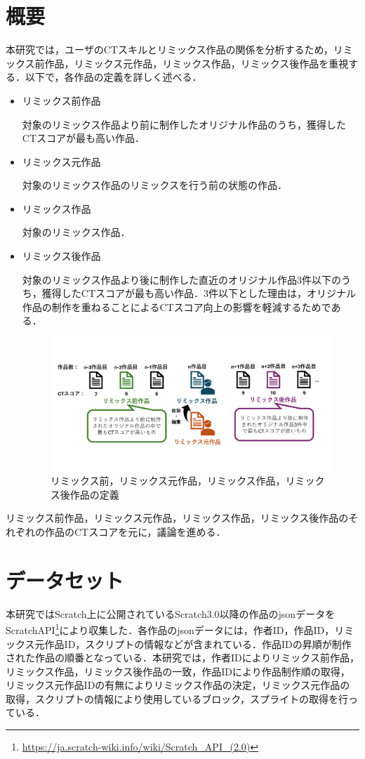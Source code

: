 \documentclass[11pt]{jreport}
\begin{document}
\section{概要}
本研究では，ユーザのCTスキルとリミックス作品の関係を分析するため，リミックス前作品，リミックス元作品，リミックス作品，リミックス後作品を重視する．以下で，各作品の定義を詳しく述べる．
\begin{itemize}
  \item リミックス前作品
  
  対象のリミックス作品より前に制作したオリジナル作品のうち，獲得したCTスコアが最も高い作品．
  
  \item リミックス元作品
  
  対象のリミックス作品のリミックスを行う前の状態の作品．
  
  \item リミックス作品
  
  対象のリミックス作品．

  \item リミックス後作品
  
  対象のリミックス作品より後に制作した直近のオリジナル作品3件以下のうち，獲得したCTスコアが最も高い作品．3件以下とした理由は，オリジナル作品の制作を重ねることによるCTスコア向上の影響を軽減するためである．

\begin{figure}[h]
\centerline{\includegraphics[width=0.9\linewidth]{@BSthesis2024_Horio/BSthesis2024_Horio_fig/case.pdf}}
\caption{リミックス前，リミックス元作品，リミックス作品，リミックス後作品の定義}
\label{fig:case}
\end{figure}
  
\end{itemize}
リミックス前作品，リミックス元作品，リミックス作品，リミックス後作品のそれぞれの作品のCTスコアを元に，議論を進める．

\section{データセット}
本研究ではScratch上に公開されているScratch3.0以降の作品のjsonデータをScratchAPI\footnote{\url{https://ja.scratch-wiki.info/wiki/Scratch_API_(2.0)}}により収集した．各作品のjsonデータには，作者ID，作品ID，リミックス元作品ID，スクリプトの情報などが含まれている．作品IDの昇順が制作された作品の順番となっている．本研究では，作者IDによりリミックス前作品，リミックス作品，リミックス後作品の一致，作品IDにより作品制作順の取得，リミックス元作品IDの有無によりリミックス作品の決定，リミックス元作品の取得，スクリプトの情報により使用しているブロック，スプライトの取得を行っている．
\end{document}
